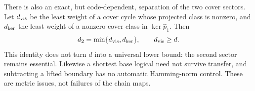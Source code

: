 There is also an exact, but code-dependent, separation of the two cover sectors. Let $d_{\rm vis}$ be the least weight of a cover cycle whose projected class is nonzero, and $d_{\rm ker}$ the least weight of a nonzero cover class in $\ker\widehat p_1$. Then
\[
 d_2=\min\{d_{\rm vis},d_{\rm ker}\},\qquad d_{\rm vis}\ge d.
\]
This identity does not turn $d$ into a universal lower bound: the second sector remains essential. Likewise a shortest base logical need not survive transfer, and subtracting a lifted boundary has no automatic Hamming-norm control. These are metric issues, not failures of the chain maps.
